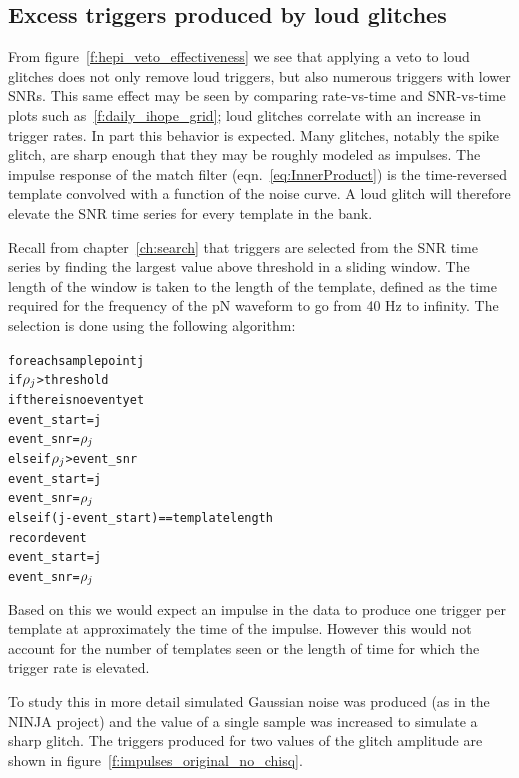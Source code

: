 \subsection{Excess triggers produced by loud glitches}
\label{ssec:penguins}

From figure~\ref{f:hepi_veto_effectiveness} we see that applying a
veto to loud glitches does not only remove loud triggers, but also
numerous triggers with lower SNRs.  This same effect may be seen by
comparing rate-vs-time and SNR-vs-time plots such
as~\ref{f:daily_ihope_grid}; loud glitches correlate with an increase
in trigger rates.  In part this behavior is expected.  Many glitches,
notably the spike glitch, are sharp enough that they may be roughly
modeled as impulses.  The impulse response of the match filter
(eqn.~\ref{eq:InnerProduct}) is the time-reversed template convolved
with a function of the noise curve.  A loud glitch will therefore
elevate the SNR time series for every template in the bank.

Recall from chapter~\ref{ch:search} that triggers are selected from
the SNR time series by finding the largest value above threshold in a
sliding window.  The length of the window is taken to the length of
the template, defined as the time required for the frequency of the pN
waveform to go from 40 Hz to infinity.  The selection is done using
the following algorithm: 

\begin{alltt}
for each sample point j
  if \(\rho\sb{j}\) > threshold
    if there is no event yet
      event\_start = j
      event\_snr   = \(\rho\sb{j}\)
    else if \(\rho\sb{j}\) > event\_snr
      event\_start = j
      event\_snr = \(\rho\sb{j}\)
    else if (j - event\_start) == template length
      record event
      event\_start = j
      event\_snr   = \(\rho\sb{j}\)
\end{alltt}

Based on this we would expect an impulse in the data to produce one
trigger per template at approximately the time of the impulse.
However this would not account for the number of templates seen or the
length of time for which the trigger rate is elevated. 

To study this in more detail simulated Gaussian noise was produced (as
in the NINJA project) and the value of a single sample was increased to
simulate a sharp glitch.  The triggers produced for two values of the
glitch amplitude are shown in
figure~\ref{f:impulses_original_no_chisq}.

